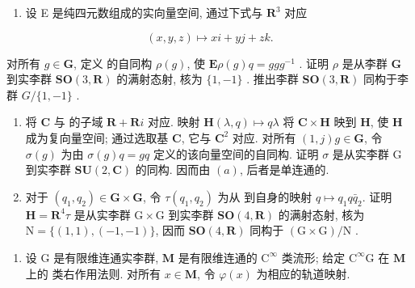 \begin{enumerate}
\def\labelenumi{(\alph{enumi})}
\setcounter{enumi}{1}
\tightlist
\item
  设 E 是纯四元数组成的实向量空间, 通过下式与 \(\mathbf{R}^3\) 对应
\end{enumerate}

\[
(x, y, z) \mapsto x i + y j + z k.
\]

对所有 \(g \in \mathbf{G}\), 定义  的自同构 \(\rho(g)\), 使 \(\mathbf{E}\)\(\rho(g)q = ggg^{-1}\) . 证明 \(\rho\) 是从李群 \(\mathbf{G}\) 到实李群 \(\mathbf{SO}(3, \mathbf{R})\) 的满射态射, 核为 \(\{1, -1\}\) . 推出李群 \(\mathbf{SO}(3, \mathbf{R})\) 同构于李群 \(G / \{1, -1\}\) .

\begin{enumerate}
\def\labelenumi{(\alph{enumi})}
\setcounter{enumi}{2}
\item
  将 \(\mathbf{C}\) 与  的子域 \(\mathbf{R} + \mathbf{R}i\) 对应. 映射 \(\mathbf{H}\)\((\lambda, q) \mapsto q\lambda\) 将 \(\mathbf{C} \times \mathbf{H}\) 映到 \(\mathbf{H}\), 使 \(\mathbf{H}\) 成为复向量空间; 通过选取基 \(\mathbf{C}\), 它与 \(\mathbf{C}^2\) 对应. 对所有 \((1, j)\)\(g \in \mathbf{G}\), 令 \(\sigma(g)\) 为由 \(\sigma(g)q = gq\) 定义的该向量空间的自同构. 证明 \(\sigma\) 是从实李群 G 到实李群 \(\mathbf{SU}(2, \mathbf{C})\) 的同构. 因而由 \((a)\), 后者是单连通的.
\item
  对于 \((q_{1}, q_{2}) \in \mathbf{G} \times \mathbf{G}\), 令 \(\tau(q_{1}, q_{2})\) 为从  到自身的映射 \(q \mapsto q_{1}q\bar{q}_{2}\). 证明 \(\mathbf{H} = \mathbf{R}^{4}\)\(\tau\) 是从实李群 \(\mathrm{G} \times \mathrm{G}\) 到实李群 \(\mathbf{SO}(4, \mathbf{R})\) 的满射态射, 核为 \(\mathrm{N} = \{(1, 1), (-1, -1)\}\), 因而 \(\mathbf{SO}(4, \mathbf{R})\) 同构于 \((\mathrm{G} \times \mathrm{G}) / \mathrm{N}\) .
\end{enumerate}

\begin{enumerate}
\def\labelenumi{\arabic{enumi}.}
\setcounter{enumi}{7}
\tightlist
\item
  设 \(\mathrm{G}\) 是有限维连通实李群, \(\mathbf{M}\) 是有限维连通的 \(\mathrm{C}^{\infty}\) 类流形; 给定 \(\mathrm{C}^{\infty}\)\(\mathrm{G}\) 在 \(\mathbf{M}\) 上的  类右作用法则. 对所有 \(x \in \mathbf{M}\), 令 \(\varphi(x)\) 为相应的轨道映射.
\end{enumerate}

